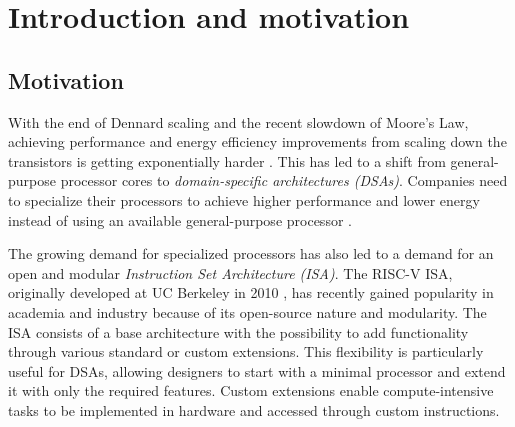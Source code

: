 
\chapter{Introduction and motivation}
\label{Introduction} 





\section{Motivation}


With the end of Dennard scaling and the recent slowdown of Moore's Law, achieving performance and energy efficiency improvements from scaling down the transistors is getting exponentially harder \cite{hennessy_computer_2019}. This has led to a shift from general-purpose processor cores to \textit{domain-specific architectures (DSAs)}. Companies need to specialize their processors to achieve higher performance and lower energy instead of using an available general-purpose processor \cite{}. 


The growing demand for specialized processors has also led to a demand for an open and modular \textit{Instruction Set Architecture (ISA)}. The RISC-V ISA, originally developed at UC Berkeley in 2010 \cite{patterson_computer_2021}, has recently gained popularity in academia and industry because of its open-source nature and modularity. The ISA consists of a base architecture with the possibility to add functionality through various standard or custom extensions\cite{waterman_risc-v_2019}. This flexibility is particularly useful for DSAs, allowing designers to start with a minimal processor and extend it with only the required features. Custom extensions enable compute-intensive tasks to be implemented in hardware and accessed through custom instructions. 


